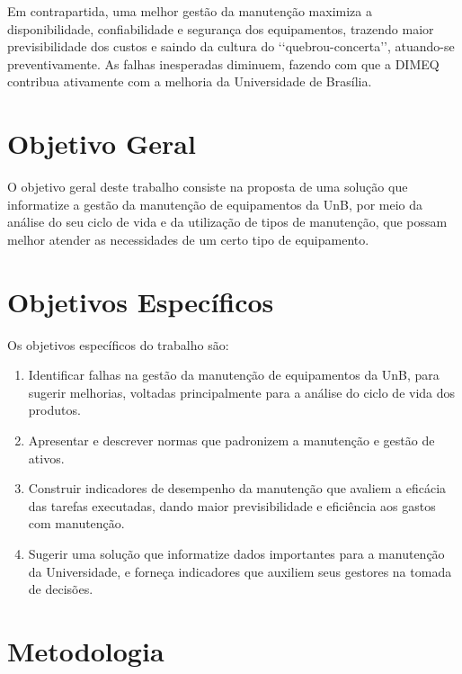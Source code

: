 Em contrapartida, uma melhor gestão da manutenção maximiza a disponibilidade, confiabilidade e segurança dos equipamentos, trazendo maior previsibilidade dos custos e saindo da cultura do \lq\lq quebrou-concerta\rq\rq, atuando-se preventivamente. As falhas inesperadas diminuem, fazendo com que a DIMEQ contribua ativamente com a melhoria da Universidade de Brasília.



\section{Objetivo Geral}
 
O objetivo geral deste trabalho consiste na proposta de uma solução que informatize a gestão da manutenção de equipamentos da UnB, por meio da análise do seu ciclo de vida e da utilização de tipos de manutenção, que possam melhor atender as necessidades de um certo tipo de equipamento. 


\section{Objetivos Específicos}

Os objetivos específicos do trabalho são:

\begin{enumerate}
	\item Identificar falhas na gestão da manutenção de equipamentos da UnB, para sugerir melhorias, voltadas principalmente para a análise do ciclo de vida dos produtos.
	\item Apresentar e descrever normas que padronizem a manutenção e gestão de ativos.
	\item Construir indicadores de desempenho da manutenção que avaliem a eficácia das tarefas executadas, dando maior previsibilidade e eficiência aos gastos com manutenção.
	\item Sugerir uma solução que informatize dados importantes para a manutenção da Universidade, e forneça indicadores que auxiliem seus gestores na tomada de decisões.
	\end{enumerate}


\section{Metodologia}


